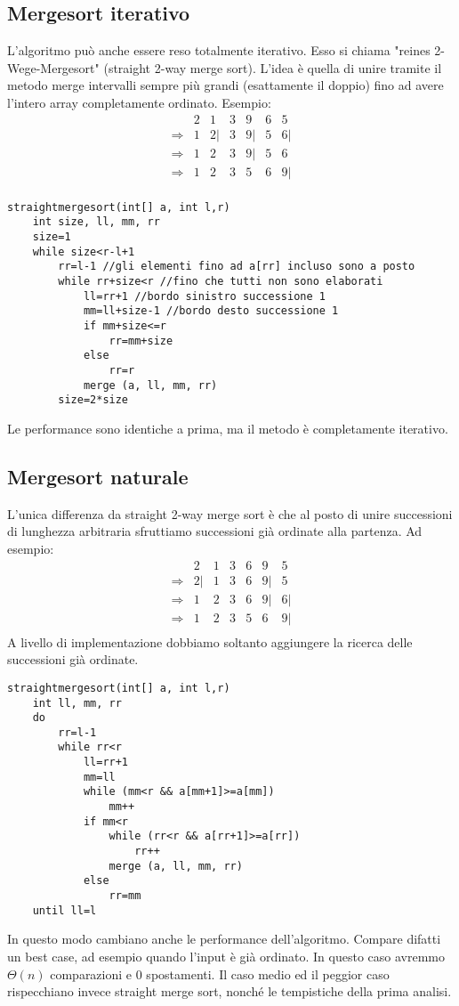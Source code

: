 \documentclass[a4paper]{book}
\begin{document}
\subsection*{Mergesort iterativo}
L'algoritmo può anche essere reso totalmente iterativo. Esso si chiama "reines 2-Wege-Mergesort" (straight 2-way merge sort). L'idea è quella di unire tramite il metodo merge intervalli sempre più grandi (esattamente il doppio) fino ad avere l'intero array completamente ordinato. Esempio:
\[\begin{array}{*{20}{c}}
{}&{2}&1&{3}&{9}&6&5\\
{\Rightarrow}&1&{2|}&{3}&{9|}&5&{6|}\\
{\Rightarrow}&1&{2}&{3}&{9|}&5&6\\
{\Rightarrow}&1&{2}&{3}&5&{6}&{9|}\\
\end{array}\]
\begin{lstlisting}
straightmergesort(int[] a, int l,r)
	int size, ll, mm, rr
	size=1
	while size<r-l+1
		rr=l-1 //gli elementi fino ad a[rr] incluso sono a posto
		while rr+size<r //fino che tutti non sono elaborati
			ll=rr+1 //bordo sinistro successione 1
			mm=ll+size-1 //bordo desto successione 1
			if mm+size<=r
				rr=mm+size
			else
				rr=r
			merge (a, ll, mm, rr)
		size=2*size				
\end{lstlisting}
Le performance sono identiche a prima, ma il metodo è completamente iterativo.
\subsection*{Mergesort naturale}
L'unica differenza da straight 2-way merge sort è che al posto di unire successioni di lunghezza arbitraria sfruttiamo successioni già ordinate alla partenza. Ad esempio:
\[\begin{array}{*{20}{c}}
{}&{2}&1&{3}&{6}&9&5\\
{\Rightarrow}&{2|}&{1}&{3}&{6}&{9|}&{5}\\
{\Rightarrow}&1&{2}&{3}&{6}&{9|}&{6|}\\
{\Rightarrow}&1&{2}&{3}&5&{6}&{9|}\\
\end{array}\]
A livello di implementazione dobbiamo soltanto aggiungere la ricerca delle successioni già ordinate.
\begin{lstlisting}
straightmergesort(int[] a, int l,r)
	int ll, mm, rr
	do
		rr=l-1
		while rr<r
			ll=rr+1
			mm=ll	
			while (mm<r && a[mm+1]>=a[mm])
				mm++
			if mm<r
				while (rr<r && a[rr+1]>=a[rr])
					rr++
				merge (a, ll, mm, rr)
			else
				rr=mm
	until ll=l								
\end{lstlisting}
In questo modo cambiano anche le performance dell'algoritmo. Compare difatti un best case, ad esempio quando l'input è già ordinato. In questo caso avremmo $\Theta (n)$ comparazioni e 0 spostamenti. Il caso medio ed il peggior caso rispecchiano invece straight merge sort, nonché le tempistiche della prima analisi.
\end{document}
